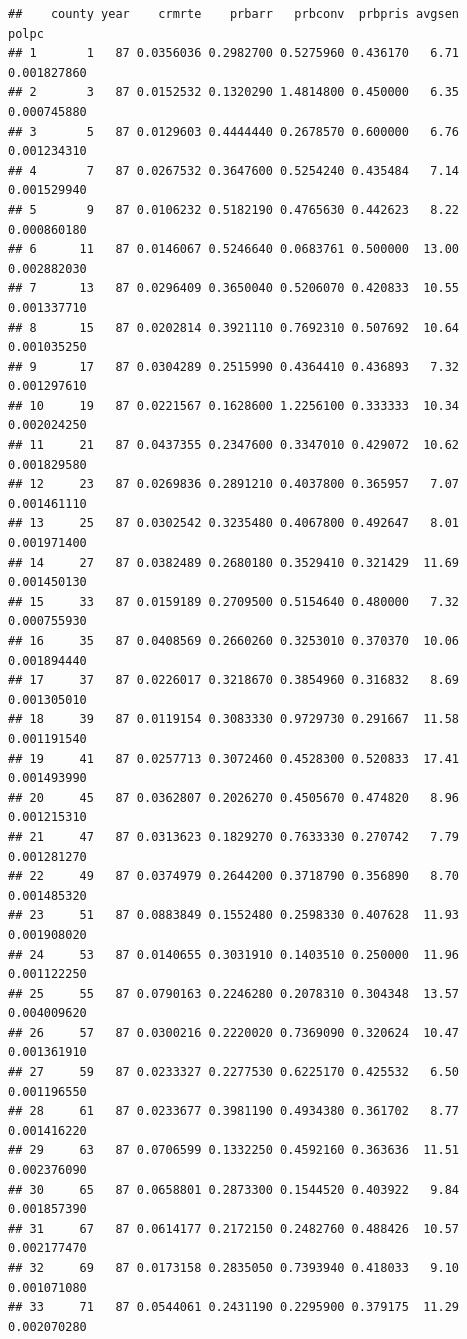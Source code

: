 \documentclass[]{article}
\begin{document}
\begin{verbatim}
##    county year    crmrte    prbarr   prbconv  prbpris avgsen       polpc
## 1       1   87 0.0356036 0.2982700 0.5275960 0.436170   6.71 0.001827860
## 2       3   87 0.0152532 0.1320290 1.4814800 0.450000   6.35 0.000745880
## 3       5   87 0.0129603 0.4444440 0.2678570 0.600000   6.76 0.001234310
## 4       7   87 0.0267532 0.3647600 0.5254240 0.435484   7.14 0.001529940
## 5       9   87 0.0106232 0.5182190 0.4765630 0.442623   8.22 0.000860180
## 6      11   87 0.0146067 0.5246640 0.0683761 0.500000  13.00 0.002882030
## 7      13   87 0.0296409 0.3650040 0.5206070 0.420833  10.55 0.001337710
## 8      15   87 0.0202814 0.3921110 0.7692310 0.507692  10.64 0.001035250
## 9      17   87 0.0304289 0.2515990 0.4364410 0.436893   7.32 0.001297610
## 10     19   87 0.0221567 0.1628600 1.2256100 0.333333  10.34 0.002024250
## 11     21   87 0.0437355 0.2347600 0.3347010 0.429072  10.62 0.001829580
## 12     23   87 0.0269836 0.2891210 0.4037800 0.365957   7.07 0.001461110
## 13     25   87 0.0302542 0.3235480 0.4067800 0.492647   8.01 0.001971400
## 14     27   87 0.0382489 0.2680180 0.3529410 0.321429  11.69 0.001450130
## 15     33   87 0.0159189 0.2709500 0.5154640 0.480000   7.32 0.000755930
## 16     35   87 0.0408569 0.2660260 0.3253010 0.370370  10.06 0.001894440
## 17     37   87 0.0226017 0.3218670 0.3854960 0.316832   8.69 0.001305010
## 18     39   87 0.0119154 0.3083330 0.9729730 0.291667  11.58 0.001191540
## 19     41   87 0.0257713 0.3072460 0.4528300 0.520833  17.41 0.001493990
## 20     45   87 0.0362807 0.2026270 0.4505670 0.474820   8.96 0.001215310
## 21     47   87 0.0313623 0.1829270 0.7633330 0.270742   7.79 0.001281270
## 22     49   87 0.0374979 0.2644200 0.3718790 0.356890   8.70 0.001485320
## 23     51   87 0.0883849 0.1552480 0.2598330 0.407628  11.93 0.001908020
## 24     53   87 0.0140655 0.3031910 0.1403510 0.250000  11.96 0.001122250
## 25     55   87 0.0790163 0.2246280 0.2078310 0.304348  13.57 0.004009620
## 26     57   87 0.0300216 0.2220020 0.7369090 0.320624  10.47 0.001361910
## 27     59   87 0.0233327 0.2277530 0.6225170 0.425532   6.50 0.001196550
## 28     61   87 0.0233677 0.3981190 0.4934380 0.361702   8.77 0.001416220
## 29     63   87 0.0706599 0.1332250 0.4592160 0.363636  11.51 0.002376090
## 30     65   87 0.0658801 0.2873300 0.1544520 0.403922   9.84 0.001857390
## 31     67   87 0.0614177 0.2172150 0.2482760 0.488426  10.57 0.002177470
## 32     69   87 0.0173158 0.2835050 0.7393940 0.418033   9.10 0.001071080
## 33     71   87 0.0544061 0.2431190 0.2295900 0.379175  11.29 0.002070280

\end{verbatim}
\end{document}

